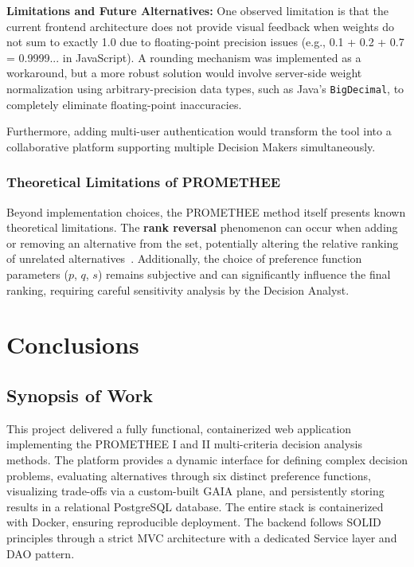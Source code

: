 \documentclass[12pt,a4paper,oneside]{report}
\begin{document}
\textbf{Limitations and Future Alternatives:} One observed limitation is that the current frontend architecture does not provide visual feedback when weights do not sum to exactly 1.0 due to floating-point precision issues (e.g., 0.1 + 0.2 + 0.7 = 0.9999... in JavaScript). A rounding mechanism was implemented as a workaround, but a more robust solution would involve server-side weight normalization using arbitrary-precision data types, such as Java's \texttt{BigDecimal}, to completely eliminate floating-point inaccuracies.

Furthermore, adding multi-user authentication would transform the tool into a collaborative platform supporting multiple Decision Makers simultaneously.

\subsection{Theoretical Limitations of PROMETHEE} Beyond implementation choices, the PROMETHEE method itself presents known theoretical limitations. The \textbf{rank reversal} phenomenon can occur when adding or removing an alternative from the set, potentially altering the relative ranking of unrelated alternatives~\cite{mareschal2013}. Additionally, the choice of preference function parameters ($p$, $q$, $s$) remains subjective and can significantly influence the final ranking, requiring careful sensitivity analysis by the Decision Analyst.

\chapter{Conclusions}

\section{Synopsis of Work}
This project delivered a fully functional, containerized web application implementing the PROMETHEE I and II multi-criteria decision analysis methods. The platform provides a dynamic interface for defining complex decision problems, evaluating alternatives through six distinct preference functions, visualizing trade-offs via a custom-built GAIA plane, and persistently storing results in a relational PostgreSQL database. The entire stack is containerized with Docker, ensuring reproducible deployment. The backend follows SOLID principles through a strict MVC architecture with a dedicated Service layer and DAO pattern.
\end{document}

